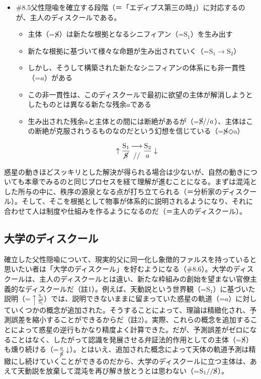 \begin{note}{}
  \begin{itemize}
    \tightlist
    \item{\#8.5}父性隠喩を確立する段階（＝「エディプス第三の時」）に対応するのが、主人のディスクールである。
      \begin{itemize}
        \tightlist
        \item 主体（=$\cancel{\textrm{S}}$）は新たな根拠となるシニフィアン（=$\textrm{S}_1$）を生み出す
        \item 新たな根拠に基づいて様々な命題が生み出されていく（=$\textrm{S}_1\rightarrow\textrm{S}_2$）
        \item しかし、そうして構築された新たなシニフィアンの体系にも非一貫性（=$a$）がある
        \item この非一貫性は、このディスクールで最初に欲望の主体が解消しようとしたものとは異なる新たな残余$a$である
        \item 生み出された残余$a$と主体との間には断絶があるが（=$\cancel{\textrm{S}}//a$）、主体はこの断絶が克服されうるものなのだという幻想を信じている（=$\cancel{\textrm{S}}$◇a）
      \end{itemize}

$$
\uparrow\frac{\mathrm{S_1}}{\mathrm{\cancel{S}}}\genfrac{}{}{0pt}{}{\longrightarrow}{//}\frac{\mathrm{S_2}}{a}\downarrow
$$
  \end{itemize}
\end{note}

惑星の動きほどスッキリとした解決が得られる場合は少ないが、自然の動きについても本章でみるのと同じプロセスを経て理解が進むことになる。まずは混沌とした所与の中に、秩序の源泉となる点が打ち立てられる（＝分析家のディスクール）。そして、そこを根拠として物事が体系的に説明されるようになり、それに合わせて人は制度や仕組みを作るようになるのだ（＝主人のディスクール）。

\subsection{大学のディスクール}\label{ux5927ux5b66ux306eux30c7ux30a3ux30b9ux30afux30fcux30eb}

確立した父性隠喩について、現実的父に同一化し象徴的ファルスを持っていると思いたい者は「大学のディスクール」を好むようになる（\#8.6）。大学のディスクールは、主人のディスクールとは違い、新たな枠組みの創始を望まない官僚主義的なディスクールだ（註1）。例えば、天動説という世界観（=\(\textrm{S}_1\)）に基づいた説明（=\(\uparrow\frac{\textrm{S}_2}{\textrm{S}_1}\)）では、説明できないままに留まっていた惑星の軌道（=\(a\)）に対していくつかの概念が追加された。そうすることによって、理論は精緻化され、予測誤差を縮小することができるからだ（註2）。実際、これらの概念を追加することによって惑星の逆行もかなり精度よく計算できた。だが、予測誤差がゼロになることはなく、したがって認識を発展させる弁証法的作用としての主体（=\(\cancel{\textrm{S}}\)）も燻り続ける（=\(\frac{a}{\cancel{\textrm{S}}}\downarrow\)）。とはいえ、追加された概念によって天体の軌道予測は精緻にし続けていくことができるのだから、大学のディスクールに立つ主体は、あえて天動説を放棄して混沌を再び解き放とうとは思わない（=\(\textrm{S}_1//\cancel{\textrm{S}}\)）。

